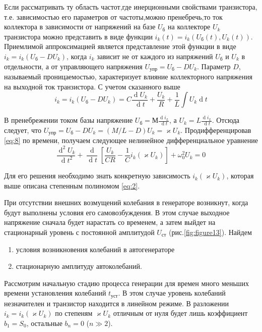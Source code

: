 Если рассматривать ту область частот,где инерционными свойствами транзистора, т.е. зависимостью его параметров от частоты,можно пренебречь,то ток коллектора в зависимости от напряжений на базе $U_\text{б}$ на коллекторе $U_k$ транзистора можно представить в виде функции $i_k(t)=i_k(U_\text{б}(t),U_k(t))$. Приемлимой аппроксимацией является представление этой функции в виде $i_k=i_k(U_\text{б}-DU_k)$, когда $i_k$ зависит не от каждого из напряжений $U_\text{б}$ и $U_k$ в отдельности, а от управляющего напряжения $U_\text{упр}=U_\text{б}-DU_k$. Параметр $D$, называемый проницаемостью, характеризует влияние коллекторного напряжения на выходной ток транзистора. С учетом сказанного выше
\begin{equation}
i_k=i_k(U_\text{б}-DU_k)=C\frac{\operatorname dU_k}{\operatorname dt}+\frac{U_k}{R}+\frac{1}{L}\int U_k \operatorname dt
\label{eq:8}
\end{equation}{}

В пренебрежении током базы напряжение $\displaystyle U_\text{б}=\text{М}\frac{\operatorname di_L}{\operatorname dt}$, а $\displaystyle U_k=L\frac{\operatorname di_L}{\operatorname dt}$. Отсюда следует, что $U_\text{упр}=U_\text{б}-DU_k=(M/L-D)U_k=\varkappa U_k$. Продифференцировав \eqref{eq:8} по времени, получаем следующее нелинейное дифференциальное уравнение
\begin{equation}
\frac{\operatorname d^2U_k}{\operatorname dt^2}+\frac{\operatorname d}{\operatorname dt}[\frac{U_k}{CR}-\frac{1}{C}i_k(\varkappa U_k)]+\omega_0^2U_k=0
\label{eq:9}
\end{equation}

Для его решения необходимо знать конкретную зависимость $i_k(\varkappa U_k)$, которая выше описана степенным полиномом \eqref{eq:2}. 

При отсутствии внешних возмущений колебания в генераторе возникнут, когда будут выполнены условия его самовозбуждения. В этом случае выходное напряжение сначала будет нарастать со временем, а
затем выйдет на стационарный уровень с постоянной амплитудой $U_\text{ст}$ (рис.\ref{fig:figure13}). Найдем
\begin{enumerate}
\item условия возникновения колебаний в автогенераторе
\item стационарную амплитуду автоколебаний.
\end{enumerate}

Рассмотрим начальную стадию процесса генерации для времен много меньших времени установления колебаний $t_\text{уст}$. В этом случае уровень колебаний незначителен и транзистор находится в линейном режиме. В разложении $i_k=i_k(\varkappa U_k)$ по степеням $\varkappa U_k$ отличным от нуля будет лишь коэффициент $b_1=S_0$, остальные $b_n=0$ ($n\gg2$).

